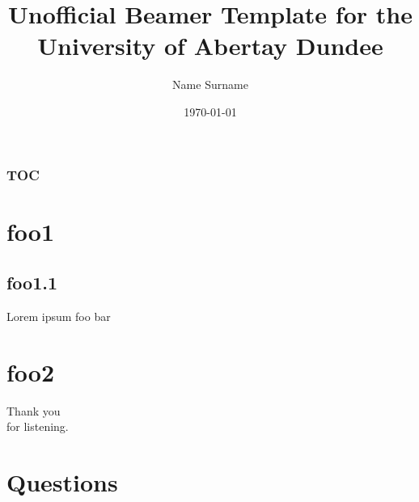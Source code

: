 \documentclass{beamer}
\author{Name Surname}
\title{Unofficial Beamer Template for the University of Abertay Dundee}
\date{\today}
\begin{document}
\begin{frame}


\titlepage
\end{frame}

\begin{frame}
	\frametitle{TOC}
	\tableofcontents
\end{frame}

\section{foo1}
\subsection{foo1.1}
\begin{frame}{Lorem ipsum}
foo bar
\end{frame}



\section{foo2}
\begin{frame}
\vfill
\begin{center}\begin{Huge}Thank you \\[10pt]
for listening.\end{Huge}\vfill
\end{center}
\vfill
\end{frame}

\section{Questions}
\center{}
\end{document}

